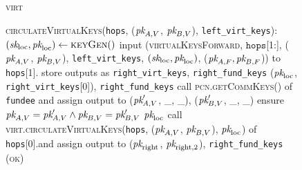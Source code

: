\begin{figure}[H]
\begin{processbox}{\textsc{virt}}
\begin{algorithmic}[1]
      \State \textsc{circulateVirtualKeys}(\texttt{hops}, ($\textit{pk}_{A, V}$, $\textit{pk}_{B,
      V}$), \texttt{left\_virt\_keys}):
      \Indent
        \State {}
        \State $(\textit{sk}_{\mathrm{loc}}, \textit{pk}_{\mathrm{loc}}) \gets
        \textsc{keyGen}()$
         
           
            \State input (\textsc{virtualKeysForward}, $\texttt{hops}$[1:],
            ($\textit{pk}_{A, V}$, $\textit{pk}_{B, V}$), \texttt{left\_virt\_keys},
            $(\textit{sk}_{\mathrm{loc}}, \textit{pk}_{\mathrm{loc}})$, ($\textit{pk}_{A, F}, \textit{pk}_{B, F}$))
            to \texttt{hops}[1].\alice{} 
            \State {}
            \State {}
            \State {}
            \State store outputs as \texttt{right\_virt\_keys},
            \texttt{right\_fund\_keys}
            \State \Return ($\textit{pk}_{\mathrm{loc}}$, \texttt{right\_virt\_keys}[0]),
            \texttt{right\_fund\_keys}
          \Else \: 
            \State {}
            \State call \textsc{pcn.getCommKeys}() of \texttt{fundee} and assign
            output to ($\textit{pk}_{A, V}'$, \_, \_), ($\textit{pk}_{B, V}'$, \_, \_)
            \State ensure $\textit{pk}_{A, V} = \textit{pk}_{A, V}' \wedge \textit{pk}_{B, V} = \textit{pk}_{B, V}'$
            \State \Return $\textit{pk}_{\mathrm{loc}}$
          \EndIf
        \Else \: 
          \State call \textsc{virt.circulateVirtualKeys}(\texttt{hops}, ($\textit{pk}_{A,
          V}$, $\textit{pk}_{B, V}$), $\textit{pk}_{\mathrm{loc}}$) of \texttt{hops}[0].\bob and
          assign output to ($\textit{pk}_{\mathrm{right}}$, $\textit{pk}_{\mathrm{right}, 2}$),
          \texttt{right\_fund\_keys}
          \State \Return (\textsc{ok})
        \EndIf
      \EndIndent
    \end{algorithmic}
  \end{processbox}
  \caption{}
  \label{code:virtual-layer:keys}
\end{figure}

